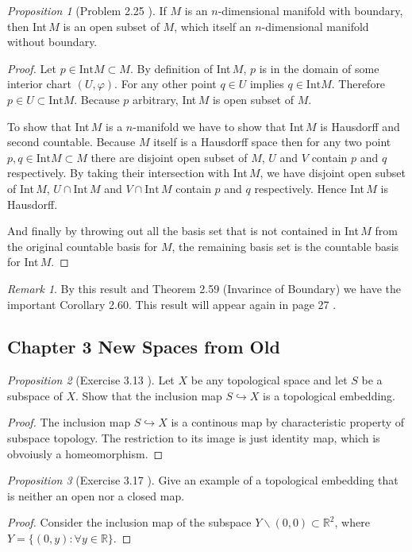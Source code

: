 \documentclass[a4paper]{article}
\theoremstyle{remark}
\newtheorem*{remark}{Remark}
\newtheorem{prop}{Proposition}
\newcommand{\er}{\mathbb{R}} %
\begin{document}
\begin{prop}[Problem 2.25 \cite{LeeTM}]
If $M$ is an $n$-dimensional manifold with boundary, then Int$\,M$ is an open subset of $M$, which itself an $n$-dimensional manifold without boundary.
\end{prop}
\begin{proof}
Let $p \in \text{Int} M \subset M$. By definition of Int$\,M$, $p$ is in the domain of some interior chart $(U,\varphi)$. For any other point $q \in U$ implies $q \in \text{Int} M$. Therefore $p \in U \subset \text{Int} M$. Because $p$ arbitrary, Int$\,M$ is open subset of $M$.

To show that Int$\, M$ is a $n$-manifold we have to show that Int$\, M$ is Hausdorff and second countable. Because $M$ itself is a Hausdorff space then for any two point $p,q \in \text{Int} M \subset M$ there are disjoint open subset of $M$, $U$ and $V$ contain $p$ and $q$ respectively. By taking their intersection with Int$\, M$, we have disjoint open subset of Int$\, M$, $U \cap \text{Int}\,M$ and $V \cap \text{Int}\, M$ contain $p$ and $q$ respectively. Hence Int$\,M$ is Hausdorff.  

And finally by throwing out all the basis set that is not contained in Int$\,M$ from the original countable basis for $M$, the remaining basis set is the countable basis for Int$\,M$.
\end{proof}
\begin{remark}
By this result and Theorem 2.59 (Invarince of Boundary) we have the important Corollary 2.60. This result will appear again in page 27 \cite{LeeSM}.
\end{remark}

\subsection*{Chapter 3 New Spaces from Old}

\begin{prop}[Exercise 3.13 \cite{LeeTM}]
	Let $X$ be any topological space and let $S$ be a subspace of $X$. Show that the inclusion map $S \hookrightarrow X$ is a topological embedding.
\end{prop}
\begin{proof}
	The inclusion map $S \hookrightarrow X$ is a continous map by characteristic property of subspace topology. The restriction to its image is just identity map, which is obvoiusly a homeomorphism.
\end{proof}

\begin{prop}[Exercise 3.17 \cite{LeeTM}]
	Give an example of a topological embedding that is neither an open nor a closed map.
\end{prop}
\begin{proof}
	Consider the inclusion map of the subspace $Y\smallsetminus (0,0) \subset \er^2$, where $ Y = \{(0,y): \forall y \in \er \}$. 
\end{proof}
\end{document}
